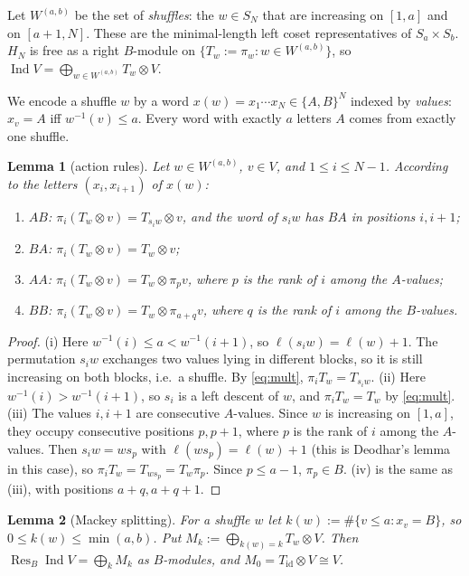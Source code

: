 \documentclass[11pt]{amsart}
\newcommand{\Ind}{\operatorname{Ind}}
\newcommand{\Res}{\operatorname{Res}}
\theoremstyle{plain}
\newtheorem{lemma}{Lemma}[section]
\theoremstyle{definition}
\begin{document}
Let $W^{(a,b)}$ be the set of \emph{shuffles}: the $w\in S_N$ that are increasing on $[1,a]$ and on $[a+1,N]$. These are the minimal-length left coset representatives of $S_a\times S_b$. $H_N$ is free as a right $B$-module on $\{T_w:=\pi_w : w\in W^{(a,b)}\}$, so $\Ind V=\bigoplus_{w\in W^{(a,b)}}T_w\otimes V$.

We encode a shuffle $w$ by a word $x(w)=x_1\cdots x_N\in\{A,B\}^N$ indexed by \emph{values}: $x_v=A$ iff $w^{-1}(v)\le a$. Every word with exactly $a$ letters $A$ comes from exactly one shuffle.

\begin{lemma}[action rules]\label{lem:rules}
Let $w\in W^{(a,b)}$, $v\in V$, and $1\le i\le N-1$. According to the letters $(x_i,x_{i+1})$ of $x(w)$:
\begin{enumerate}[label=\textup{(\roman*)},itemsep=1pt]
\item $AB$: $\pi_i(T_w\otimes v)=T_{s_iw}\otimes v$, and the word of $s_iw$ has $BA$ in positions $i,i+1$;
\item $BA$: $\pi_i(T_w\otimes v)=T_w\otimes v$;
\item $AA$: $\pi_i(T_w\otimes v)=T_w\otimes\pi_pv$, where $p$ is the rank of $i$ among the $A$-values;
\item $BB$: $\pi_i(T_w\otimes v)=T_w\otimes\pi_{a+q}v$, where $q$ is the rank of $i$ among the $B$-values.
\end{enumerate}
\end{lemma}

\begin{proof}
(i) Here $w^{-1}(i)\le a<w^{-1}(i+1)$, so $\ell(s_iw)=\ell(w)+1$. The permutation $s_iw$ exchanges two values lying in different blocks, so it is still increasing on both blocks, i.e.\ a shuffle. By \eqref{eq:mult}, $\pi_iT_w=T_{s_iw}$.
(ii) Here $w^{-1}(i)>w^{-1}(i+1)$, so $s_i$ is a left descent of $w$, and $\pi_iT_w=T_w$ by \eqref{eq:mult}.
(iii) The values $i,i+1$ are consecutive $A$-values. Since $w$ is increasing on $[1,a]$, they occupy consecutive positions $p,p+1$, where $p$ is the rank of $i$ among the $A$-values. Then $s_iw=ws_p$ with $\ell(ws_p)=\ell(w)+1$ (this is Deodhar's lemma in this case), so $\pi_iT_w=T_{ws_p}=T_w\pi_p$. Since $p\le a-1$, $\pi_p\in B$.
(iv) is the same as (iii), with positions $a+q,a+q+1$.
\end{proof}

\begin{lemma}[Mackey splitting]\label{lem:mackey}
For a shuffle $w$ let $k(w):=\#\{v\le a: x_v=B\}$, so $0\le k(w)\le\min(a,b)$. Put $M_k:=\bigoplus_{k(w)=k}T_w\otimes V$. Then $\Res_B\Ind V=\bigoplus_{k}M_k$ as $B$-modules, and $M_0=T_{\mathrm{id}}\otimes V\cong V$.
\end{lemma}
\end{document}
